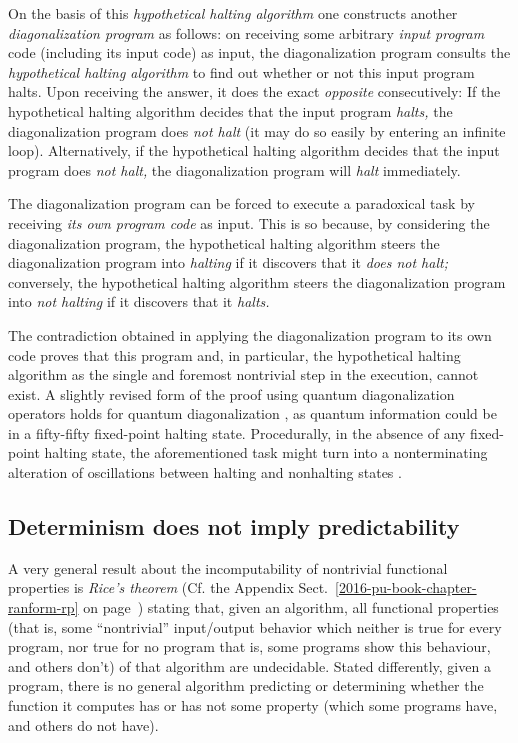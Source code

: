 On the basis of this {\em hypothetical halting algorithm}
one constructs another {\em diagonalization program} as follows:
on receiving some arbitrary {\em input program} code (including its input code) as input, the {diagonalization program}
consults the {\em hypothetical halting algorithm} to find out whether or not this
{input program} halts.  Upon receiving the answer, it does the exact {\em opposite} consecutively:
If  the   hypothetical halting algorithm  decides that the   input program  {\em halts,}
the   diagonalization program  does {\em not halt} (it may do so easily by entering an infinite loop).
Alternatively, if  the   hypothetical halting algorithm  decides that the  input program  does {\em not halt,}
the {diagonalization program} will {\em halt} immediately.

The {diagonalization program} can be forced to execute a paradoxical task by
receiving {\em its own program code} as input.
This is so because, by considering the {diagonalization program,}
the {hypothetical halting algorithm} steers the {diagonalization program} into
{\em halting} if it discovers that it {\em does not halt;}
conversely,  the {hypothetical halting algorithm} steers the {diagonalization program} into
{\em not halting} if it discovers that it {\em halts.}


The contradiction obtained in applying the {diagonalization program} to its own code proves that this program
and, in particular, the {hypothetical halting algorithm} as the single and foremost nontrivial step in the execution, cannot exist.
A slightly revised form of the proof using quantum diagonalization operators
holds for quantum diagonalization \cite{1612095},
as quantum information could be in a fifty-fifty fixed-point halting state.
Procedurally, in the absence of any fixed-point halting state,
the aforementioned task might turn into a nonterminating
alteration of oscillations between halting and nonhalting states \cite{Kauffman198753}.

\subsection{Determinism does not imply predictability}
\label{2016-pu-book-chapter-up-dnip-rice}

A very general result about the incomputability of nontrivial functional properties is  {\em Rice's theorem}
  (Cf. the Appendix Sect.~\ref{2016-pu-book-chapter-ranform-rp} on page~\pageref{2016-pu-book-chapter-ranform-rp})
stating that,  given an algorithm, all functional properties
(that is, some ``nontrivial'' input/output behavior which neither is true for every program, nor true for no program
that is, some programs show this behaviour, and others don't)
of that algorithm are undecidable.
Stated differently,  given a program,
there is no general algorithm predicting or determining whether the function it computes has or has  not
some property (which some programs have, and others do not have).


